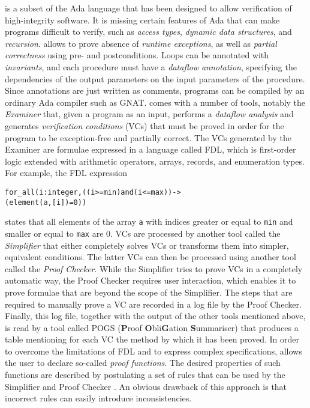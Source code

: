 \SPARK{} \cite{Barnes} is a subset of the Ada language that has been designed to
allow verification of high-integrity software. It is missing certain features of
Ada that can make programs difficult to verify, such as \emph{access types},
\emph{dynamic data structures}, and \emph{recursion}. \SPARK{} allows to prove
absence of \emph{runtime exceptions}, as well as \emph{partial correctness}
using pre- and postconditions. Loops can be annotated with \emph{invariants},
and each procedure must have a \emph{dataflow annotation}, specifying the
dependencies of the output parameters on the input parameters of the procedure.
Since \SPARK{} annotations are just written as comments, \SPARK{} programs can be
compiled by an ordinary Ada compiler such as GNAT. \SPARK{} comes with a number
of tools, notably the \emph{Examiner} that, given a \SPARK{} program as an input,
performs a \emph{dataflow analysis} and generates \emph{verification conditions}
(VCs) that must be proved in order for the program to be exception-free and partially
correct. The VCs generated by the Examiner are formulae expressed in
a language called FDL, which is first-order logic extended with
arithmetic operators, arrays, records, and enumeration types. For example,
the FDL expression
\begin{alltt}
  for_all(i: integer, ((i >= min) and (i <= max)) ->
    (element(a, [i]) = 0))
\end{alltt}
states that all elements of the array \texttt{a} with indices greater or equal to
\texttt{min} and smaller or equal to \texttt{max} are $0$.
VCs are processed by another \SPARK{} tool called the
\emph{Simplifier} that either completely solves VCs or transforms them
into simpler, equivalent conditions. The latter VCs
can then be processed using another tool called
the \emph{Proof Checker}. While the Simplifier tries to prove VCs in a completely
automatic way, the Proof Checker requires user interaction, which enables it to
prove formulae that are beyond the scope of the Simplifier. The steps
that are required to manually prove a VC are recorded in a log file by the Proof
Checker. Finally, this log file, together with the output of the other \SPARK{} tools
mentioned above, is read by a tool called POGS (\textbf{P}roof \textbf{O}bli\textbf{G}ation
\textbf{S}ummariser) that produces a table mentioning for each VC the method by which
it has been proved.
In order to overcome the limitations of FDL and to express complex specifications,
\SPARK{} allows the user to declare so-called
\emph{proof functions}. The desired properties of such functions are described
by postulating a set of rules that can be used by the Simplifier and Proof Checker
\cite[\S 11.7]{Barnes}. An obvious drawback of this approach is that incorrect
rules can easily introduce inconsistencies.

